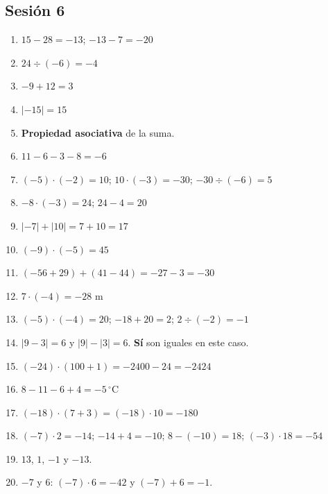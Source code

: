 \documentclass[12pt, letterpaper]{article}
\begin{document}
\subsection*{Sesión 6}
\begin{enumerate}[leftmargin=*, label=\textbf{\arabic*.}]
  \item $15 - 28 = -13$; $-13 - 7 = -20$
  \item $24 \div (-6) = -4$
  \item $-9 + 12 = 3$
  \item $|-15| = 15$
  \item \textbf{Propiedad asociativa} de la suma.
  \item $11 - 6 - 3 - 8 = -6$
  \item $(-5) \cdot (-2) = 10$; $10 \cdot (-3) = -30$; $-30 \div (-6) = 5$
  \item $-8 \cdot (-3) = 24$; $24 - 4 = 20$
  \item $|-7| + |10| = 7 + 10 = 17$
  \item $(-9) \cdot (-5) = 45$
  \item $(-56 + 29) + (41 - 44) = -27 - 3 = -30$
  \item $7 \cdot (-4) = -28$ m
  \item $(-5) \cdot (-4) = 20$; $-18 + 20 = 2$; $2 \div (-2) = -1$
  \item $|9 - 3| = 6$ y $|9| - |3| = 6$. \textbf{Sí} son iguales en este caso.
  \item $(-24) \cdot (100 + 1) = -2400 - 24 = -2424$
  \item $8 - 11 - 6 + 4 = -5\,^{\circ}$C
  \item $(-18) \cdot (7 + 3) = (-18) \cdot 10 = -180$
  \item $(-7) \cdot 2 = -14$; $-14 + 4 = -10$; $8 - (-10) = 18$; $(-3) \cdot 18 = -54$
  \item $13$, $1$, $-1$ y $-13$.
  \item $-7$ y $6$: $(-7) \cdot 6 = -42$ y $(-7) + 6 = -1$.
\end{enumerate}
\end{document}
